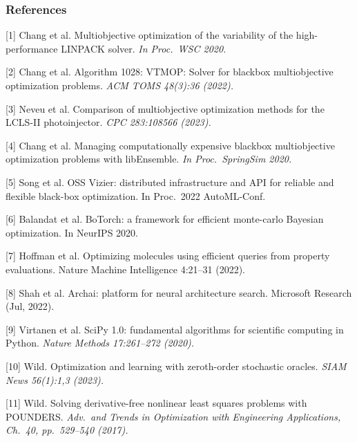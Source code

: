 \documentclass[aspectratio=169]{beamer}
\begin{document}
\begin{frame}\frametitle{References}

{\tiny\it

[1] Chang et al.
Multiobjective optimization of the variability of the high-performance 
LINPACK solver.
{\sl In Proc.\ WSC 2020.}

\medskip

[2] Chang et al.
Algorithm 1028: VTMOP: Solver for blackbox multiobjective optimization problems.
{\sl ACM TOMS 48(3):36 (2022).}

\medskip

[3] Neveu et al.
Comparison of multiobjective optimization methods for the LCLS-II photoinjector.
{\sl CPC 283:108566 (2023).}

\medskip

[4] Chang et al.
Managing computationally expensive blackbox multiobjective optimization
problems with libEnsemble.
{\sl In Proc.\ SpringSim 2020.}

\medskip

[5] Song et al.
OSS Vizier: distributed infrastructure and API for reliable and flexible black-box optimization.
In Proc.\ 2022 AutoML-Conf.

\medskip

[6] Balandat et al.
BoTorch: a framework for efficient monte-carlo Bayesian optimization.
In NeurIPS 2020.

\medskip

[7] Hoffman et al.
Optimizing molecules using efficient queries from property evaluations.
Nature Machine Intelligence 4:21--31 (2022).

\medskip

[8] Shah et al.
Archai: platform for neural architecture search.
Microsoft Research (Jul, 2022).

\medskip

[9] Virtanen et al.
SciPy 1.0: fundamental algorithms for scientific computing in Python.
{\sl Nature Methods 17:261--272 (2020).}

\medskip

[10] Wild. Optimization and learning with zeroth-order stochastic oracles.
{\sl SIAM News 56(1):1,3 (2023).}

\medskip

[11] Wild.
Solving derivative-free nonlinear least squares problems with POUNDERS.
{\sl Adv.\ and Trends in Optimization with Engineering Applications,
Ch.\ 40, pp.\ 529--540
(2017).}

\medskip

}
\end{frame}
\end{document}
